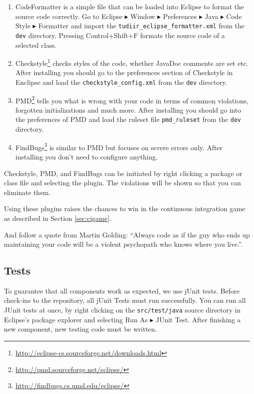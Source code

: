 \begin{enumerate}

	\item CodeFormatter is a simple file that can be loaded into Eclipse to format the source code correctly. Go to Eclipse $\blacktriangleright$ Window $\blacktriangleright$ Preferences $\blacktriangleright$ Java $\blacktriangleright$ Code Style $\blacktriangleright$ Formatter and import the \texttt{tudiir\_eclipse\_formatter.xml} from the \texttt{dev} directory. Pressing Control+Shift+F formats the source code of a selected class.

	\item Checkstyle\footnote{\url{http://eclipse-cs.sourceforge.net/downloads.html}} checks styles of the code, whether JavaDoc comments are set etc. After installing you should go to the preferences section of Checkstyle in Enclipse and load the \texttt{checkstyle\_config.xml} from the \texttt{dev} directory.

	\item PMD\footnote{\url{http://pmd.sourceforge.net/eclipse/}} tells you what is wrong with your code in terms of common violations, forgotten initializations and much more. After installing you should go into the preferences of PMD and load the ruleset file \texttt{pmd\_ruleset} from the \texttt{dev} directory.

	\item FindBugs\footnote{\url{http://findbugs.cs.umd.edu/eclipse/}} is similar to PMD but focuses on severe errors only. After installing you don't need to configure anything.

\end{enumerate}

Checkstyle, PMD, and FindBugs can be initiated by right clicking a package or class file and selecting the plugin. The violations will be shown so that you can eliminate them.

Using these plugins raises the chances to win in the continuous integration game as described in Section \ref{sec:cigame}.

And follow a quote from Martin Golding: ``Always code as if the guy who ends up maintaining your code will be a violent psychopath who knows where you live.''.

\subsection{Tests}

To guarantee that all components work as expected, we use jUnit tests. Before check-ins to the repository, all jUnit Tests must run successfully. You can run all JUnit tests at once, by right clicking on the \texttt{src/test/java} source directory in Eclipse's package explorer and selecting Run As $\blacktriangleright$ JUnit Test. After finishing a new component, new testing code must be written.
